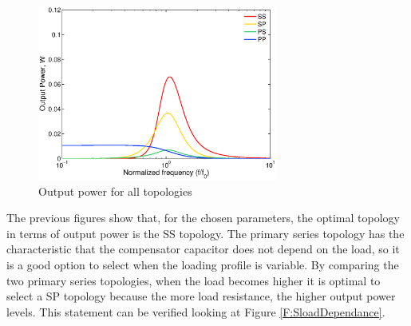 \begin{figure}[h!]
\begin{center}
\includegraphics[width=0.7\textwidth]{./images/PoutModel} 
\caption{Output power for all topologies}
\label{F:PoutTopologies}
\end{center}
\end{figure}

The previous figures show that, for the chosen parameters, the optimal topology in terms of output power is the SS topology. The primary series topology has the characteristic that the compensator capacitor does not depend on the load, so it is a good option to select when the loading profile is variable. By comparing the two primary series topologies, when the load becomes higher it is optimal to select a SP topology because the more load resistance, the higher output power levels. This statement can be verified looking at Figure \ref{F:SloadDependance}. 

